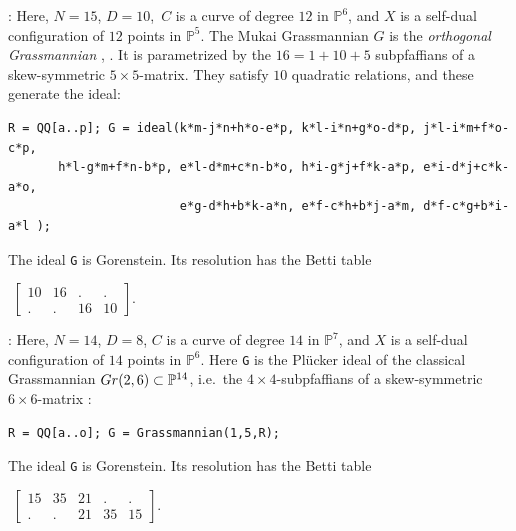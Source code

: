 \documentclass[12pt]{extarticle}
\theoremstyle{definition}
\numberwithin{theorem}{section}
\theoremstyle{plain}\newtheorem{ithm}{Theorem}
\newcommand{\PP}{\mathbb{P}}
\begin{document}
\bigskip \noindent {}: 
Here, $N = 15$, $D = 10$, $\,C$ is a curve of degree $12$ in $\PP^6$, and
$X$ is a self-dual configuration of $12$  points in $\PP^5$.
The Mukai Grassmannian $G$ is the {\em orthogonal
Grassmannian}  \cite[(3.1)]{Kap1}, \cite[Section 3.2]{Kap2}.
It is parametrized by the $16 = 1 + 10 + 5$
subpfaffians of a skew-symmetric $5 \times 5$-matrix.
They  satisfy $10$ quadratic relations, and these 
generate the ideal:
\begin{verbatim}
R = QQ[a..p]; G = ideal(k*m-j*n+h*o-e*p, k*l-i*n+g*o-d*p, j*l-i*m+f*o-c*p, 
       h*l-g*m+f*n-b*p, e*l-d*m+c*n-b*o, h*i-g*j+f*k-a*p, e*i-d*j+c*k-a*o, 
                        e*g-d*h+b*k-a*n, e*f-c*h+b*j-a*m, d*f-c*g+b*i-a*l );
\end{verbatim}
\vspace{-0.1in}
The ideal {\tt G} is Gorenstein. Its resolution has the Betti table
\begin{tiny} $ \,\,\begin{bmatrix} 10 & 16 & . & . \\ . & . &  16 & 10 \end{bmatrix}$. \end{tiny}

\medskip \noindent {}:
Here, $N=14$, $D=8$, $C$ is a curve of degree $14$ in $\PP^7$, and
$X$ is a self-dual configuration of $14$ points in $\PP^6$.
Here {\tt G} is the Pl\"ucker ideal of  the classical Grassmannian ${\rm Gr}(2,6) \subset \PP^{14}$,
i.e.~the $4 \times 4$-subpfaffians of a skew-symmetric $6 \times 6$-matrix \cite[Section 3.1]{Kap1}:
\begin{verbatim}
R = QQ[a..o]; G = Grassmannian(1,5,R);
\end{verbatim}
\vspace{-0.1in}
The ideal {\tt G} is Gorenstein. Its resolution has the Betti table
\begin{tiny} $ \,\,\begin{bmatrix} 15 & 35 & 21 &  . & . \\
 . & . &  21 & 35 & 15 \end{bmatrix}$. \end{tiny}
\end{document}
